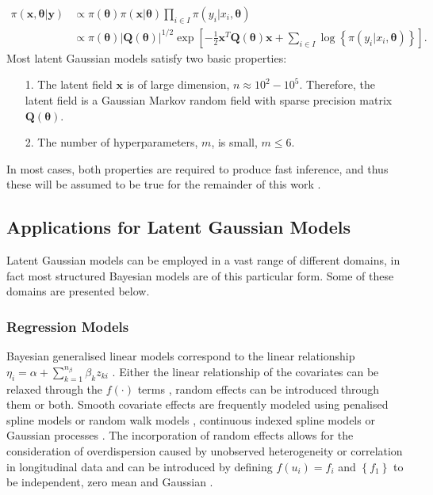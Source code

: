 \begin{align}
    \pi\left(\pmb{x},\pmb{\theta}|\pmb{y}\right)&\propto\pi\left(\pmb{\theta}\right)\pi\left(\pmb{x}|\pmb{\theta}\right)\prod_{i\in I}\pi\left(y_i|x_i,\pmb{\theta}\right) \nonumber\\
    &\propto \pi\left(\pmb{\theta}\right)\left|\pmb{Q}\left(\pmb{\theta}\right)\right|^{1/2}\exp\left[-\frac{1}{2}\pmb{x}^T\pmb{Q}\left(\pmb{\theta}\right)\pmb{x}+\sum_{i\in I}\log\left\lbrace\pi\left(y_i|x_i,\pmb{\theta}\right)\right\rbrace\right].
\end{align}
Most latent Gaussian models satisfy two basic properties:
\begin{itemize}
    \item[1.] The latent field $\pmb{x}$ is of large dimension, $n\approx10^2-10^5$. Therefore, the latent field is a Gaussian Markov random field with sparse precision matrix $\pmb{Q}\left(\pmb{\theta}\right)$.
    \item[2.] The number of hyperparameters, $m$, is small, $m\leq6$.
\end{itemize}
In most cases, both properties are required to produce fast inference, and thus these will be assumed to be true for the remainder of this work \autocite[][]{rue2009approximate}.
\subsection{Applications for Latent Gaussian Models}
Latent Gaussian models can be employed in a vast range of different domains, in fact most structured Bayesian models are of this particular form. Some of these domains are presented below.
\subsubsection{Regression Models}
Bayesian generalised linear models correspond to the linear relationship $\eta_i=\alpha+\sum_{k=1}^{n_\beta}\beta_k z_{ki}$ \autocite[][]{dey2000generalized}. Either the linear relationship of the covariates can be relaxed through the $f\left(\cdot\right)$ terms \autocite[][]{fahrmeir2013multivariate}, random effects can be introduced through them or both. Smooth covariate effects are frequently modeled using penalised spline models \autocite[][]{lang2004bayesian} or random walk models \autocite[][]{fahrmeir2013multivariate}, continuous indexed spline models \autocite[][]{rue2005gaussian} or Gaussian processes \autocite[][]{chu2005gaussian}. The incorporation of random effects allows for the consideration of overdispersion caused by unobserved heterogeneity or correlation in longitudinal data and can be introduced by defining $f\left(u_i\right)=f_i$ and $\left\lbrace f_1\right\rbrace$ to be independent, zero mean and Gaussian \autocite[][]{fahrmeir2001bayesian}.
